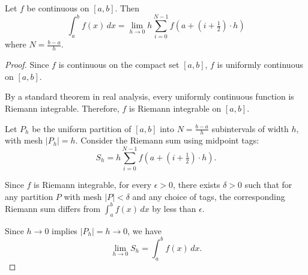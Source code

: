 \documentclass{article}
\begin{document}
\begin{theorem}
Let $f$ be continuous on $[a,b]$. Then
\[
\int_a^b f(x)\, dx = \lim_{h \to 0} h \sum_{i=0}^{N-1} f\left(a + \left(i + \tfrac{1}{2}\right) \cdot h\right)
\]
where $N = \frac{b-a}{h}$.
\end{theorem}

\begin{proof}
Since $f$ is continuous on the compact set $[a,b]$, $f$ is uniformly continuous on $[a,b]$. 

By a standard theorem in real analysis, every uniformly continuous function is Riemann integrable. Therefore, $f$ is Riemann integrable on $[a,b]$.

Let $P_h$ be the uniform partition of $[a,b]$ into $N = \frac{b-a}{h}$ subintervals of width $h$, with mesh $|P_h| = h$. Consider the Riemann sum using midpoint tags:
\[
S_h = h \sum_{i=0}^{N-1} f\left(a + \left(i + \tfrac{1}{2}\right)\cdot h\right).
\]

Since $f$ is Riemann integrable, for every $\epsilon > 0$, there exists $\delta > 0$ such that for any partition $P$ with mesh $|P| < \delta$ and any choice of tags, the corresponding Riemann sum differs from $\int_a^b f(x)\,dx$ by less than $\epsilon$.

Since $h \to 0$ implies $|P_h| = h \to 0$, we have
\[
\lim_{h \to 0} S_h = \int_a^b f(x)\,dx.
\]
\end{proof}
\end{document}
